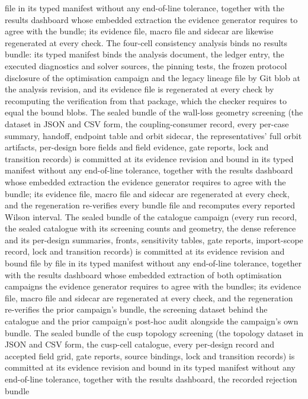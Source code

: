 \documentclass[11pt]{article}
\begin{document}
file in its typed manifest without any end-of-line tolerance, together with the
results dashboard whose embedded extraction the evidence generator requires to
agree with the bundle; its evidence file, macro file and sidecar are likewise
regenerated at every check. The four-cell consistency analysis binds no results
bundle: its typed manifest binds the analysis document, the ledger entry, the
executed diagnostics and solver sources, the pinning tests, the frozen protocol
disclosure of the optimisation campaign and the legacy lineage file by Git blob
at the analysis revision, and its evidence file is regenerated at every check by
recomputing the verification from that package, which the checker requires to
equal the bound blobs. The sealed bundle of the wall-loss geometry screening
(the dataset in JSON and CSV form, the coupling-consumer record, every per-case
summary, handoff, endpoint table and orbit sidecar, the representatives' full
orbit artifacts, per-design bore fields and field evidence, gate reports, lock
and transition records) is committed at its evidence revision and bound in its
typed manifest without any end-of-line tolerance, together with the results
dashboard whose embedded extraction the evidence generator requires to agree
with the bundle; its evidence file, macro file and sidecar are regenerated at
every check, and the regeneration re-verifies every bundle file and recomputes
every reported Wilson interval. The sealed bundle of the catalogue campaign
(every run record, the sealed catalogue with its screening counts and geometry,
the dense reference and its per-design summaries, fronts, sensitivity tables,
gate reports, import-scope record, lock and transition records) is committed at
its evidence revision and bound file by file in its typed manifest without any
end-of-line tolerance, together with the results dashboard whose embedded
extraction of both optimisation campaigns the evidence generator requires to
agree with the bundles; its evidence file, macro file and sidecar are
regenerated at every check, and the regeneration re-verifies the prior
campaign's bundle, the screening dataset behind the catalogue and the prior
campaign's post-hoc audit alongside the campaign's own bundle. The sealed bundle
of the cusp topology screening (the topology dataset in JSON and CSV form, the
cusp-cell catalogue, every per-design record and accepted field grid, gate
reports, source bindings, lock and transition records) is committed at its
evidence revision and bound in its typed manifest without any end-of-line
tolerance, together with the results dashboard, the recorded rejection bundle
\end{document}
